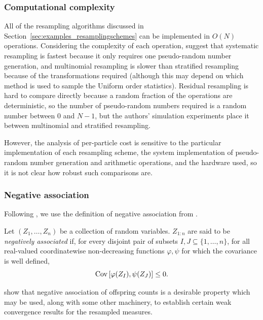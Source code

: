 \subsubsection{Computational complexity}
All of the resampling algorithms discussed in Section~\ref{sec:examples_resamplingschemes} can be implemented in $O(N)$ operations.
Considering the complexity of each operation, \textcite{hol2006} suggest that systematic resampling is fastest because it only requires one pseudo-random number generation, and multinomial resampling is slower than stratified resampling because of the transformations required (although this may depend on which method is used to sample the Uniform order statistics). Residual resampling is hard to compare directly because a random fraction of the operations are deterministic, so the number of pseudo-random numbers required is a random number between $0$ and $N-1$, but the authors' simulation experiments place it between multinomial and stratified resampling.

However, the analysis of per-particle cost is sensitive to the particular implementation of each resampling scheme, the system implementation of pseudo-random number generation and arithmetic operations, and the hardware used, so it is not clear how robust such comparisons are.




\subsubsection{Negative association}
Following \textcite{gerber2017}, we use the definition of negative association from \textcite{joag1983}.
\begin{defn}
Let $(Z_1, \dots, Z_n)$ be a collection of random variables. 
$Z_{1:n}$ are said to be \emph{negatively associated} if, for every disjoint pair of subsets $I, J \subseteq \{1,\dots,n\}$, for all real-valued coordinatewise non-decreasing functions $\varphi, \psi$ for which the covariance is well defined,
\begin{equation*}
\operatorname{Cov} \left[ \varphi( Z_I) , \psi(Z_J) \right] \leq 0 .
\end{equation*}
\end{defn}
\textcite{gerber2017} show that negative association of offspring counts is a desirable property which may be used, along with some other machinery, to establish certain weak convergence results for the resampled measures.

